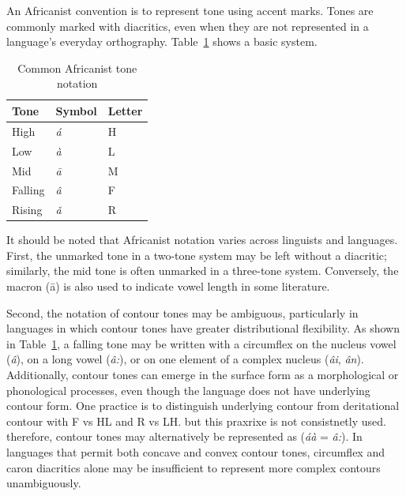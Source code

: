 An Africanist convention is to represent tone using accent marks. Tones are commonly 
marked with diacritics, even when they are not represented in a language’s everyday 
orthography. Table~\ref{tab:africanist} shows a basic system.
\begin{table}[ht]
	\centering
	\caption{Common Africanist tone notation}
	\label{tab:africanist}
	\begin{tabular}{lll}
		\hline
		\textbf{Tone} & \textbf{Symbol} & \textbf{Letter} \\
		\hline
		High      & \textit{á} & H      \\
		Low       & \textit{à} & L      \\
		Mid       & \textit{ā} & M      \\
		Falling   & \textit{â} & F   \\
		Rising    & \textit{ǎ} & R   \\
		\hline
	\end{tabular}
\end{table}

It should be noted that Africanist notation varies across linguists 
and languages. First, the unmarked tone in a two-tone system may be 
left without a diacritic; similarly, the mid tone is often unmarked 
in a three-tone system. Conversely, the macron (ā) is also used to 
indicate vowel length in some literature. 

Second, the notation of contour tones may be ambiguous, particularly 
in languages in which contour tones have greater distributional 
flexibility. As shown in Table~\ref{tab:africanist}, a falling tone 
may be written with a circumflex on the nucleus vowel (\textit{â}), 
on a long vowel (\textit{â:}), or on one element of a complex 
nucleus (\textit{âi}, \textit{ân}). Additionally, contour tones
can emerge in the surface form as a morphological or phonological processes, even though the language does not have underlying contour form. One practice is to distinguish underlying contour from deritational contour with F vs HL and R vs LH. but this praxrixe is 
not consistnetly used. therefore, contour tones may alternatively be represented as (\textit{áà} = \textit{â:}). In 
languages that permit both concave and convex contour tones, 
circumflex and caron diacritics alone may be insufficient to 
represent more complex contours unambiguously.

